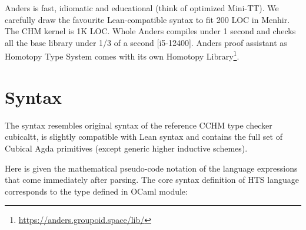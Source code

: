 \documentclass[a4paper,UKenglish,cleveref, autoref, thm-restate]{lipics-v2021}
\begin{document}
Anders is fast, idiomatic and educational (think of optimized Mini-TT). We carefully draw the favourite Lean-compatible
syntax to fit 200 LOC in Menhir. The CHM kernel is 1K LOC. Whole Anders compiles under 1
second and checks all the base library under 1/3 of a second [i5-12400]. Anders proof assistant
as Homotopy Type System comes with its own Homotopy Library\footnote{\url{https://anders.groupoid.space/lib/}}.

\section{Syntax}

The syntax resembles original syntax of the reference CCHM type checker cubicaltt,
is slightly compatible with Lean syntax and contains the full set of Cubical Agda \cite{CubicalAgda}
primitives (except generic higher inductive schemes).

Here is given the mathematical pseudo-code notation of the language
expressions that come immediately after parsing. The core syntax definition of HTS language
corresponds to the type defined in OCaml module:
\end{document}
